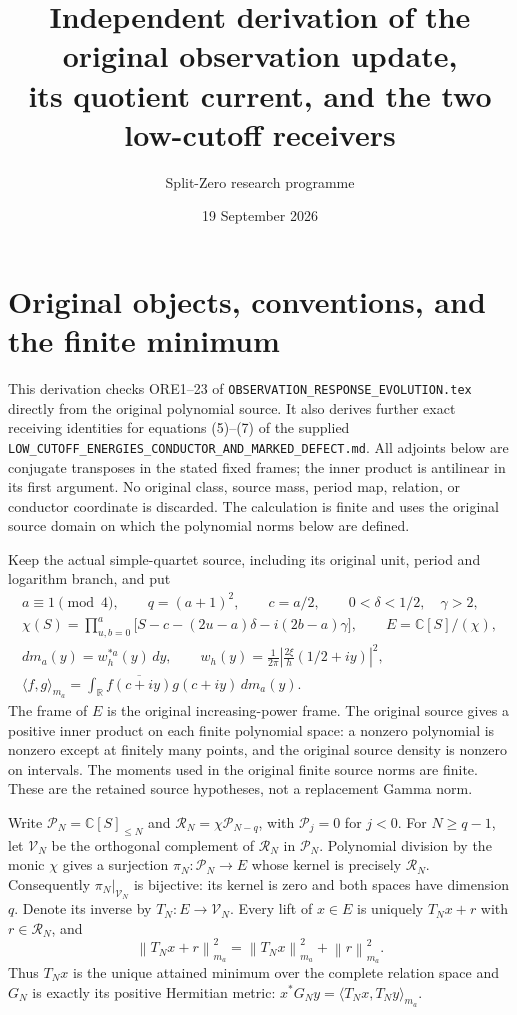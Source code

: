 \documentclass[11pt,a4paper]{article}
\title{Independent derivation of the original observation update,\protect\\
its quotient current, and the two low-cutoff receivers}
\author{Split-Zero research programme}
\date{19 September 2026}
\newcommand{\C}{\mathbb C}
\newcommand{\R}{\mathbb R}
\newcommand{\norm}[1]{\left\lVert#1\right\rVert}
\begin{document}
\maketitle

\section{Original objects, conventions, and the finite minimum}

This derivation checks ORE1--23 of
\texttt{OBSERVATION\_RESPONSE\_EVOLUTION.tex} directly from the
original polynomial source. It also derives further exact receiving
identities for equations (5)--(7) of the supplied
\texttt{LOW\_CUTOFF\_ENERGIES\_CONDUCTOR\_AND\_MARKED\_DEFECT.md}.
All adjoints below are conjugate transposes in the stated fixed frames;
the inner product is antilinear in its first argument. No original
class, source mass, period map, relation, or conductor coordinate is
discarded. The calculation is finite and uses the original source
domain on which the polynomial norms below are defined.

Keep the actual simple-quartet source, including its original unit,
period and logarithm branch, and put
\begin{equation}\label{oid:objects}
\begin{gathered}
a\equiv1\pmod4,\qquad q=(a+1)^2,\qquad c=a/2,\qquad
0<\delta<1/2,\quad\gamma>2,\\
\chi(S)=\prod_{u,b=0}^a
\bigl[S-c-(2u-a)\delta-i(2b-a)\gamma\bigr],\qquad
E=\C[S]/(\chi),\\
dm_a(y)=w_h^{*a}(y)\,dy,\qquad
w_h(y)=\frac1{2\pi}\left|\frac{2\xi}{h}(1/2+iy)\right|^2,\\
\langle f,g\rangle_{m_a}
=\int_{\R}\overline{f(c+iy)}g(c+iy)\,dm_a(y).
\end{gathered}
\end{equation}
The frame of $E$ is the original increasing-power frame. The original
source gives a positive inner product on each finite polynomial space:
a nonzero polynomial is nonzero except at finitely many points, and
the original source density is nonzero on intervals. The moments used
in the original finite source norms are finite. These are the retained
source hypotheses, not a replacement Gamma norm.

Write $\mathcal P_N=\C[S]_{\leq N}$ and
$\mathcal R_N=\chi\mathcal P_{N-q}$, with $\mathcal P_j=0$ for
$j<0$. For $N\geq q-1$, let $\mathcal V_N$ be the orthogonal
complement of $\mathcal R_N$ in $\mathcal P_N$. Polynomial division
by the monic $\chi$ gives a surjection
$\pi_N:\mathcal P_N\to E$ whose kernel is precisely $\mathcal R_N$.
Consequently $\pi_N|_{\mathcal V_N}$ is bijective: its kernel is
zero and both spaces have dimension $q$. Denote its inverse by
$T_N:E\to\mathcal V_N$. Every lift of $x\in E$ is uniquely
$T_Nx+r$ with $r\in\mathcal R_N$, and
\[
 \norm{T_Nx+r}_{m_a}^2=\norm{T_Nx}_{m_a}^2+\norm r_{m_a}^2.
\]
Thus $T_Nx$ is the unique attained minimum over the complete relation
space and $G_N$ is exactly its positive Hermitian metric:
$x^*G_Ny=\langle T_Nx,T_Ny\rangle_{m_a}$.
\end{document}
